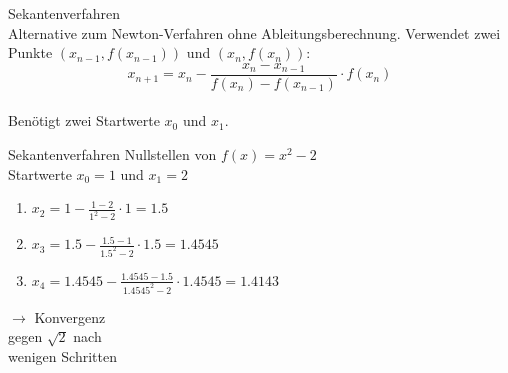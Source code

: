 \begin{concept}{Sekantenverfahren}\\
    Alternative zum Newton-Verfahren ohne Ableitungsberechnung. Verwendet zwei Punkte $(x_{n-1}, f(x_{n-1}))$ und $(x_n, f(x_n))$:
    \vspace{-2mm}\\
    $$x_{n+1} = x_n - \frac{x_n-x_{n-1}}{f(x_n)-f(x_{n-1})} \cdot f(x_n)$$
    \vspace{-3mm}\\
    Benötigt zwei Startwerte $x_0$ und $x_1$.
\end{concept}


\begin{example2}{Sekantenverfahren} Nullstellen von $f(x)=x^2-2$\\
Startwerte $x_0 = 1$ und $x_1 = 2$
\vspace{1mm}\\
\begin{minipage}[t]{0.65\textwidth}
    \vspace{-3mm}
    \begin{enumerate}
        \item $x_2 = 1 - \frac{1-2}{1^2-2} \cdot 1 = 1.5$
        \item $x_3 = 1.5 - \frac{1.5-1}{1.5^2-2} \cdot 1.5 = 1.4545$
        \item $x_4 = 1.4545 - \frac{1.4545-1.5}{1.4545^2-2} \cdot 1.4545 = 1.4143$
    \end{enumerate}
\end{minipage}
\hspace{2mm}
\begin{minipage}[t]{0.28\textwidth}
    $\rightarrow$ Konvergenz\\ gegen $\sqrt{2}$ nach \\wenigen Schritten
\end{minipage}
\end{example2}

